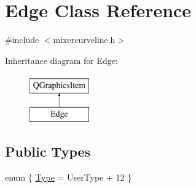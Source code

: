 \hypertarget{class_edge}{\section{Edge Class Reference}
\label{class_edge}
}


{\ttfamily \#include $<$mixercurveline.\-h$>$}

Inheritance diagram for Edge\-:\begin{figure}[H]
\begin{center}
\leavevmode
\includegraphics[height=2.000000cm]{class_edge}
\end{center}
\end{figure}
\subsection*{Public Types}
\begin{DoxyCompactItemize}
\item 
enum \{ \hyperlink{group___u_a_v_object_widget_utils_gga05d42f7e18658014a5ee7236f233e32da59a3ef5ffd963601ffda52bb7bf42b3c}{Type} = User\-Type + 12
 \}
\end{DoxyCompactItemize}
